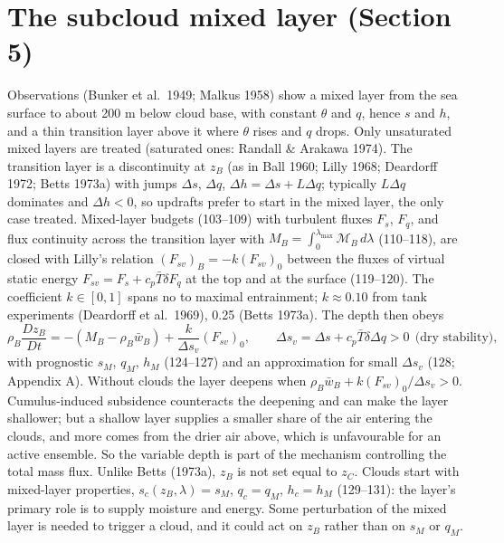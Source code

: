 \documentclass[10pt,a4paper]{article}
\newcommand{\MB}{\mathcal M_B}
\begin{document}
\section{The subcloud mixed layer (Section 5)}
Observations (Bunker et al.\ 1949; Malkus 1958) show a mixed layer from the sea surface to about 200 m below cloud base, with constant $\theta$ and $q$, hence $s$ and $h$, and a thin transition layer above it where $\theta$ rises and $q$ drops. Only unsaturated mixed layers are treated (saturated ones: Randall \& Arakawa 1974). The transition layer is a discontinuity at $z_B$ (as in Ball 1960; Lilly 1968; Deardorff 1972; Betts 1973a) with jumps $\Delta s$, $\Delta q$, $\Delta h=\Delta s+L\Delta q$; typically $L\Delta q$ dominates and $\Delta h<0$, so updrafts prefer to start in the mixed layer, the only case treated. Mixed-layer budgets (103--109) with turbulent fluxes $F_s$, $F_q$, and flux continuity across the transition layer with $M_B=\int_0^{\lambda_{\max}}\MB\,d\lambda$ (110--118), are closed with Lilly's relation $(F_{sv})_B=-k(F_{sv})_0$ between the fluxes of virtual static energy $F_{sv}=F_s+c_p\bar T\delta F_q$ at the top and at the surface (119--120). The coefficient $k\in[0,1]$ spans no to maximal entrainment; $k\approx0.10$ from tank experiments (Deardorff et al.\ 1969), 0.25 (Betts 1973a). The depth then obeys
\[
\rho_B\frac{Dz_B}{Dt}=-(M_B-\rho_B\bar w_B)+\frac{k}{\Delta s_v}(F_{sv})_0,\qquad \Delta s_v=\Delta s+c_p\bar T\delta\Delta q>0\ \ \text{(dry stability)},
\]
with prognostic $s_M$, $q_M$, $h_M$ (124--127) and an approximation for small $\Delta s_v$ (128; Appendix A). Without clouds the layer deepens when $\rho_B\bar w_B+k(F_{sv})_0/\Delta s_v>0$. Cumulus-induced subsidence counteracts the deepening and can make the layer shallower; but a shallow layer supplies a smaller share of the air entering the clouds, and more comes from the drier air above, which is unfavourable for an active ensemble. So the variable depth is part of the mechanism controlling the total mass flux. Unlike Betts (1973a), $z_B$ is not set equal to $z_C$. Clouds start with mixed-layer properties, $s_c(z_B,\lambda)=s_M$, $q_c=q_M$, $h_c=h_M$ (129--131): the layer's primary role is to supply moisture and energy. Some perturbation of the mixed layer is needed to trigger a cloud, and it could act on $z_B$ rather than on $s_M$ or $q_M$.
\end{document}
